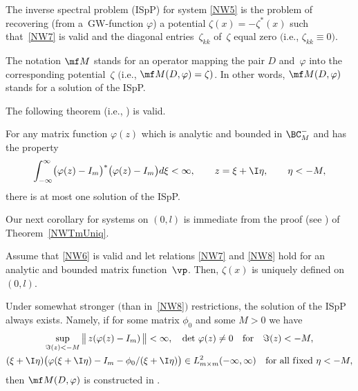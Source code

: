 The inverse spectral problem (ISpP) for system
\eqref{NW5} is the problem of recovering (from a~GW-function $\varphi$)
a potential
$\zeta (x) = - \zeta^* (x)$
 such that~\eqref{NW7} is valid and the diagonal entries~$\zeta_{kk}$ of~$\zeta$ equal zero $($i.e., $\zeta_{kk} \equiv 0)$.

\begin{Notation}
The notation $\mf M$
stands for
an operator mapping the pair $D$ and~$\varphi $
into the corresponding potential~$\zeta$
$($i.e., ${\mf M} (D, \varphi) = \zeta)$. In other words, ${\mf M} (D, \varphi)$ stands for a solution of the ISpP.
\end{Notation}


\noindent The following theorem (i.e., \cite[Theorem 4.8]{SaSaR}) is valid.
\begin{Theorem}\label{NWTmUniq}
For any
matrix function
$\varphi (z)$ which is
analytic and bounded in
$\BC^{-}_M$
and has the
property
\begin{gather}
  \int_{- \infty}^\infty
   \bigl(
    \varphi (z) - I_m
   \bigr)^*
   \bigl(
    \varphi (z) - I_m
   \bigr)
  d \xi
  < \infty,
\qquad
  z = \xi + \I \eta,
  \qquad
  \eta <- M ,
 \label{NW8}
\end{gather}
there is at most one solution of the ISpP.
\end{Theorem}
Our next corollary for systems on $(0,l)$ is immediate from the proof (see \cite[pp.~108--109]{SaSaR}) of Theorem~\ref{NWTmUniq}.

\begin{Corollary} \label{CyUniq} Assume that \eqref{NW6} is valid and let relations \eqref{NW7} and \eqref{NW8} hold
for an analytic and bounded matrix function~$\vp$. Then, $\zeta(x)$ is uniquely defined on~$(0,l)$.
\end{Corollary}

\begin{Remark}\label{NWInvPr} Under somewhat stronger $($than in~\eqref{NW8}$)$
restrictions, the solution of the ISpP always exists. Namely, if for some matrix $\phi_0$ and some $M>0$
 we have
\begin{gather} \label{NW9}
\sup_{\Im(z)<-M}
   \big\| \,
   z ( \varphi (z) - I_m) \,
   \big\|
   < \infty, \quad \det \, \varphi (z) \not= 0 \quad {\mathrm{for}} \quad \Im(z) <-M,
     \\
   (\xi+\I\eta)\big( \varphi (\xi+\I\eta) - I_m - \phi_0 / (\xi+\I \eta) \big)
   \in L_{m \times m}^2 (- \infty, \infty)
   \quad \text{for all f\/ixed} \
   \eta<-M,
 \label{NW10}
\end{gather}
then ${\mf M} (D, \varphi)$ is constructed in \cite[Theorem~4.10]{SaSaR}.
\end{Remark}

